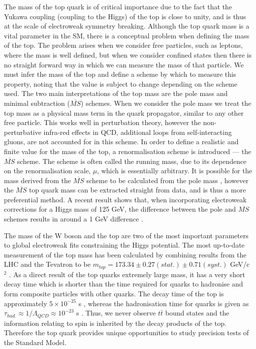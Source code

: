 The mass of the top quark is of critical importance due to the fact that the Yukawa coupling (coupling to the Higgs) of the top is close to 
unity, and is thus at the scale of electroweak symmetry breaking. Although the top quark mass is a vital parameter in the SM, there is a 
conceptual problem when defining the mass of the top. The problem arises when we consider free particles, such as leptons, where the mass is 
well defined, but when we consider confined states then there is no straight forward way in which we can measure the mass of that particle. We must infer the mass of the top and define a scheme by which to measure this property, noting that the value is subject to change depending on the scheme used. The two main interpretations of the top mass are the pole mass and minimal subtraction ($\overline{MS}$) schemes. When we consider the pole mass we treat the top mass as a physical mass term in the quark propagator, similar to any other free particle. This works well in perturbation theory, however the non-perturbative infra-red effects in QCD, additional loops from self-interacting gluons, are not accounted for in this scheme. In order to define a realistic and finite value for the mass of the top, a renormalisation scheme is introduced --- the $\overline{MS}$ scheme. The scheme is often called the running mass, due to its dependence on the renormalisation scale, $\mu$, which is essentially arbitrary. It is possible for the mass derived from the $\overline{MS}$ scheme to be calculated from the pole mass \cite{Melnikov:2000qh}, however the $\overline{MS}$ top quark mass can be extracted straight from data, and is thus a more preferential method. A recent result shows that, when incorporating electroweak corrections for a Higgs mass of 125 GeV, the difference between the pole and $\overline{MS}$ schemes results in around a 1 GeV difference \cite{Jegerlehner:2012kn}. 

The mass of the W boson and the top are two of the most important parameters to global electroweak fits constraining the Higgs potential. The most up-to-date measurement of the top mass has been calculated by combining results from the LHC and the Tevatron to be $m_{top} = 173.34 \pm 0.27(stat.) \pm 0.71(syst.)$ GeV/c$^2$ \cite{ATLAS:2014wva}. As a direct result of the top quarks extremely large mass, it has a very short decay time which is shorter than the time required for quarks to hadronise and form composite particles with other quarks. The decay time of the top is approximately $5 \times 10^{-25}$ s \cite{Quadt:2007jk}, whereas the hadronisation time for quarks is given as $\tau_{had.} \approx 1/\Lambda_{QCD} \approx 10^{-23}$ s \cite{0954-3899-37-7A-075021}. Thus, we never observe $t\bar{t}$ bound states and the information relating to spin is inherited by the decay products of the top. Therefore the top quark provides unique opportunities to study precision tests of the Standard Model.



